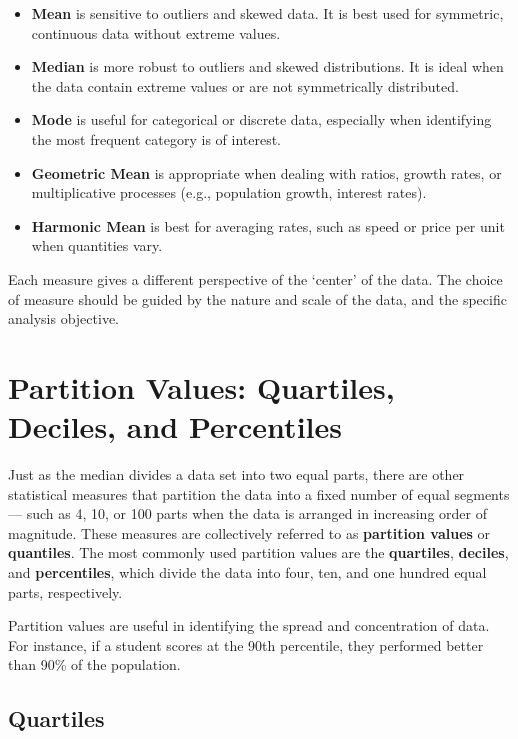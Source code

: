 \documentclass[twoside]{book}
\begin{document}
\begin{itemize}
    \item \textbf{Mean} is sensitive to outliers and skewed data. It is best used for symmetric, continuous data without extreme values.

    \item \textbf{Median} is more robust to outliers and skewed distributions. It is ideal when the data contain extreme values or are not symmetrically distributed.

    \item \textbf{Mode} is useful for categorical or discrete data, especially when identifying the most frequent category is of interest.

    \item \textbf{Geometric Mean} is appropriate when dealing with ratios, growth rates, or multiplicative processes (e.g., population growth, interest rates).

    \item \textbf{Harmonic Mean} is best for averaging rates, such as speed or price per unit when quantities vary.

\end{itemize}

Each measure gives a different perspective of the `center' of the data. The choice of measure should be guided by the nature and scale of the data, and the specific analysis objective.

\section{Partition Values: Quartiles, Deciles, and Percentiles}

Just as the median divides a data set into two equal parts, there are other statistical measures that partition the data into a fixed number of equal segments — such as 4, 10, or 100 parts when the data is arranged in increasing order of magnitude. These measures are collectively referred to as \textbf{partition values} or \textbf{quantiles}. The most commonly used partition values are the \textbf{quartiles}, \textbf{deciles}, and \textbf{percentiles}, which divide the data into four, ten, and one hundred equal parts, respectively.

Partition values are useful in identifying the spread and concentration of data. For instance, if a student scores at the 90th percentile, they performed better than 90\% of the population.

\subsection{Quartiles}
\end{document}
